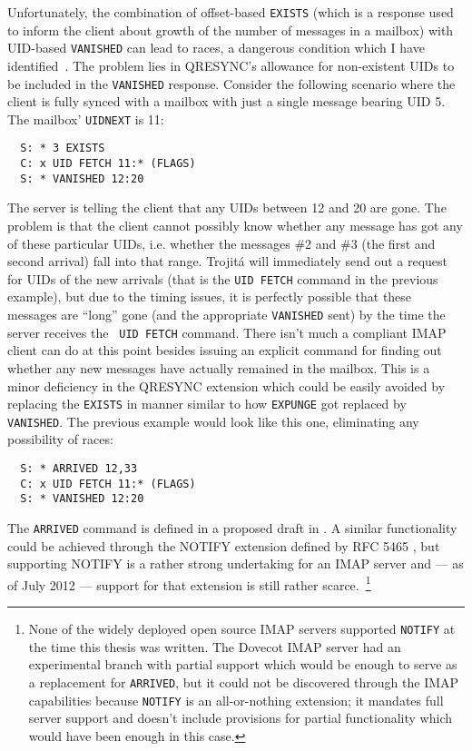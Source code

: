 \documentclass[trojita]{subfiles}
\begin{document}
Unfortunately, the combination of offset-based {\tt EXISTS} (which is a response used to inform the client about growth
of the number of messages in a mailbox) with UID-based {\tt VANISHED} can lead to races, a dangerous condition which I
have identified~\cite{kundrat-vanished-race}.  The problem lies in QRESYNC's allowance for non-existent UIDs to be
included in the {\tt VANISHED} response.  Consider the following scenario where the client is fully synced with a
mailbox with just a single message bearing UID 5.  The mailbox' {\tt UIDNEXT} is 11:

\begin{verbatim}
  S: * 3 EXISTS
  C: x UID FETCH 11:* (FLAGS)
  S: * VANISHED 12:20
\end{verbatim}

The server is telling the client that any UIDs between 12 and 20 are gone.  The problem is that the client cannot
possibly know whether any message has got any of these particular UIDs, i.e. whether the messages \#2 and \#3 (the first
and second arrival) fall into that range.  Trojitá will immediately send out a request for UIDs of the new arrivals
(that is the {\tt UID FETCH} command in the previous example), but due to the timing issues, it is perfectly possible
that these messages are ``long'' gone (and the appropriate {\tt VANISHED} sent) by the time the server receives the {\tt
UID FETCH} command.  There isn't much a compliant IMAP client can do at this point besides issuing an explicit command
for finding out whether any new messages have actually remained in the mailbox.  This is a minor deficiency in the
QRESYNC extension which could be easily avoided by replacing the {\tt EXISTS} in manner similar to how {\tt EXPUNGE} got
replaced by {\tt VANISHED}.  The previous example would look like this one, eliminating any possibility of races:

\begin{verbatim}
  S: * ARRIVED 12,33
  C: x UID FETCH 11:* (FLAGS)
  S: * VANISHED 12:20
\end{verbatim}

The {\tt ARRIVED} command is defined in a proposed draft in .  A similar functionality could
be achieved through the NOTIFY extension defined by RFC 5465 \cite{rfc5465}, but supporting NOTIFY is a rather strong
undertaking for an IMAP server and --- as of July 2012 --- support for that extension is still rather
scarce.~\footnote{None of the widely deployed open source IMAP servers supported {\tt NOTIFY} at the time this thesis
was written.  The Dovecot IMAP server had an experimental branch with partial support which would be enough to serve as
a replacement for {\tt ARRIVED}, but it could not be discovered through the IMAP capabilities because {\tt NOTIFY} is an
all-or-nothing extension; it mandates full server support and doesn't include provisions for partial functionality which
would have been enough in this case.}
\end{document}
